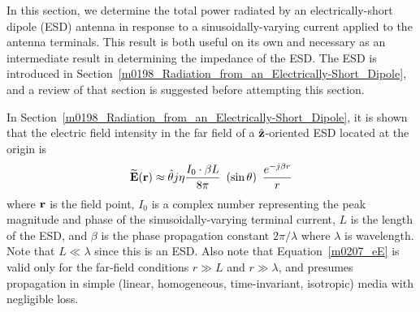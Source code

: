 

\label{m0207_Total_Power_Radiated_by_an_Electrically-Short_Dipole} %

In this section, we determine the total power radiated by an electrically-short dipole (ESD) antenna in response to a sinusoidally-varying current applied to the antenna terminals.  This result is both useful on its own and necessary as an intermediate result in determining the impedance of the ESD.
The ESD is introduced in Section~\ref{m0198_Radiation_from_an_Electrically-Short_Dipole}, and a review of that section is suggested before attempting this section.

In Section~\ref{m0198_Radiation_from_an_Electrically-Short_Dipole}, it is shown that the electric field intensity in the far field of a $\hat{\bf z}$-oriented ESD located at the origin is 
%
\begin{equation}
\widetilde{\bf E}({\bf r}) \approx  \hat{\bf \theta} j \eta \frac{I_0\cdot\beta L}{8\pi} ~\left(\sin\theta\right) ~\frac{e^{-j\beta r}}{r}
\label{m0207_eE}
\end{equation}
%
where 
${\bf r}$ is the field point,
$I_0$ is a complex number representing the peak magnitude and phase of the sinusoidally-varying terminal current,
$L$ is the length of the ESD,
and $\beta$ is the phase propagation constant $2\pi/\lambda$ where $\lambda$ is wavelength.
Note that $L\ll\lambda$ since this is an ESD. 
Also note that Equation~\ref{m0207_eE} is valid only for the far-field conditions $r\gg L$ and $r\gg \lambda$, and presumes propagation in simple (linear, homogeneous, time-invariant, isotropic) media with negligible loss.

